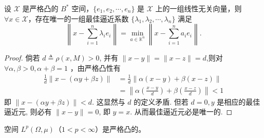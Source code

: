 \documentclass[lang=cn,newtx,10pt,scheme=chinese,thmcnt=chapter]{elegantbook}
\begin{document}
\begin{theorem}
设 $\mathscr{X}$ 是严格凸的 ${B}^*$ 空间，$\{e_1, e_2, \cdots, e_n\}$ 是 $\mathscr{X}$ 上的一组线性无关向量，则 $\forall x \in \mathscr{X}$，存在唯一的一组最佳逼近系数 $\{\lambda_1, \lambda_2, \cdots, \lambda_n\}$ 满足
\[
\left\|x - \sum_{i=1}^n \lambda_i e_i \right\| = \min_{a \in \mathbb{K}^n} \left\|x - \sum_{i=1}^n a_i e_i \right\|.
\]
\end{theorem}
\begin{proof}
 倘若 $d \triangleq \rho(x, M)>0$, 并有 $\|x-y\|=\|x-z\|=d$,则对 $\forall \alpha, \beta>0, \alpha+\beta=1$ ，由严格凸性有
\begin{equation*}
\begin{aligned}
\frac{1}{d}\|x-(\alpha y+\beta z)\| & =\frac{1}{d}\|\alpha(x-y)+\beta(x-z)\| \\
& =\left\|\alpha\left(\frac{x-y}{d}\right)+\beta\left(\frac{x-z}{d}\right)\right\|<1
\end{aligned}
\end{equation*}
即 $\|x-(\alpha y+\beta z)\|<d$. 这显然与 $d$ 的定义矛盾. 但若 $d=0, y$ 是相应的最佳逼近元, 则必有 $\|x-y\|=0$, 即 $y=x$. 从而最佳逼近元必是唯一的.
\end{proof}
\begin{example}
空间 $L^p(\Omega, \mu)$（$1 < p < \infty$）是严格凸的。
\end{example}
\end{document}
